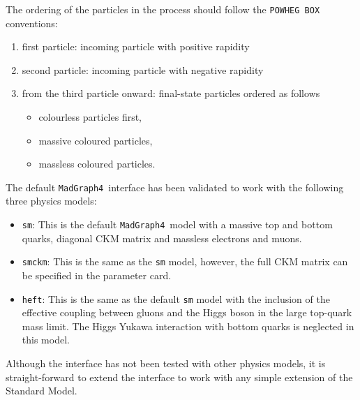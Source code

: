 \documentclass[paper]{JHEP3}
\newcommand\POWHEGBOX{{\tt POWHEG BOX}}
\newcommand\MG{{\tt MadGraph4}}
\begin{document}
The ordering of the particles in the process should follow the \POWHEGBOX{}
conventions: 
\begin{enumerate}
  \item first particle: incoming particle with positive rapidity
  
  \item second particle: incoming particle with negative rapidity
  
  \item from the third particle onward: final-state particles ordered as
  follows
  \begin{itemize}
    \item colourless particles first,
    
    \item massive coloured particles,
    
    \item massless coloured particles.
  \end{itemize}
\end{enumerate}
%
The default \MG\ interface has been validated to work with the
following three physics models:
\begin{itemize}
\item \verb|sm|: This is the default \MG\ model with a massive top
  and bottom quarks, diagonal CKM matrix and massless electrons and
  muons.
\item \verb|smckm|: This is the same as the \verb|sm| model, however,
  the full CKM matrix can be specified in the parameter card.
\item \verb|heft|: This is the same as the default \verb|sm| model with the
  inclusion of the effective coupling between gluons and the Higgs boson in
  the large top-quark mass limit. The Higgs Yukawa interaction with bottom
  quarks is neglected in this model.
\end{itemize}
Although the interface has not been tested with other physics models,
it is straight-forward to extend the interface to work with any simple
extension of the Standard Model.
\end{document}
